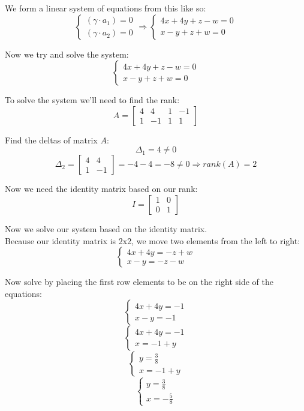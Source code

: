 \documentclass[11pt]{article}
\begin{document}
We form a linear system of equations from this like so:
\[
\left\{
\begin{aligned}
(\gamma \cdot a_1) = 0 \\
(\gamma \cdot a_2) = 0
\end{aligned}
\Rightarrow
\left\{
\begin{aligned}
4x+4y+z-w = 0 \\
x-y+z+w = 0
\end{aligned}
\]

Now we try and solve the system:
\[
\left\{
\begin{aligned}
4x+4y+z-w = 0 \\
x-y+z+w = 0
\end{aligned}
\]
\]

To solve the system we'll need to find the rank:
\[
A =
\begin{bmatrix}
4 & 4 & 1 & -1 \\
1 & -1 & 1 & 1
\end{bmatrix}
\]

Find the deltas of matrix $A$:
\[
\Delta_1 = 4 \neq 0
\]
\[
\Delta_2 =
\begin{bmatrix}
4 & 4 \\
1 & -1
\end{bmatrix}
= -4 - 4 = -8 \neq 0
\Rightarrow
rank(A) = 2
\]

Now we need the identity matrix based on our rank:
\[
I =
\begin{bmatrix}
1 & 0 \\
0 & 1
\end{bmatrix}
\]

Now we solve our system based on the identity matrix. \\
Because our identity matrix is 2x2, we move two elements from the left to right:
\[
\left\{
\begin{aligned}
4x+4y = -z+w \\
x-y = -z-w
\end{aligned}
\]

Now solve by placing the first row elements to be on the right side of the equations:
\[
\left\{
\begin{aligned}
4x+4y = -1 \\ 
x-y = -1
\end{aligned}
\]
\[
\left\{
\begin{aligned}
4x+4y = -1 \\ 
x = -1 + y
\end{aligned}
\]
\[
\left\{
\begin{aligned}
y = \frac{3}{8} \\ 
x = -1 + y
\end{aligned}
\]
\[
\left\{
\begin{aligned}
y = \frac{3}{8} \\ 
x = -\frac{5}{8}
\end{aligned}
\]
\end{document}
